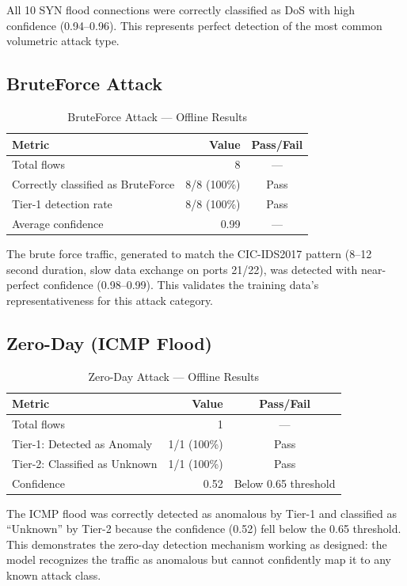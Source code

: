\documentclass[12pt,a4paper,twoside]{report}
\begin{document}
All 10 SYN flood connections were correctly classified as DoS with high confidence (0.94--0.96). This represents perfect detection of the most common volumetric attack type.

\subsection{BruteForce Attack}

\begin{table}[H]
\centering
\caption{BruteForce Attack — Offline Results}
\begin{tabularx}{\textwidth}{lrc}
\toprule
\textbf{Metric} & \textbf{Value} & \textbf{Pass/Fail} \\
\midrule
Total flows & 8 & — \\
Correctly classified as BruteForce & 8/8 (100\%) & Pass \\
Tier-1 detection rate & 8/8 (100\%) & Pass \\
Average confidence & 0.99 & — \\
\bottomrule
\end{tabularx}
\end{table}

The brute force traffic, generated to match the CIC-IDS2017 pattern (8--12 second duration, slow data exchange on ports 21/22), was detected with near-perfect confidence (0.98--0.99). This validates the training data's representativeness for this attack category.

\subsection{Zero-Day (ICMP Flood)}

\begin{table}[H]
\centering
\caption{Zero-Day Attack — Offline Results}
\begin{tabularx}{\textwidth}{lrc}
\toprule
\textbf{Metric} & \textbf{Value} & \textbf{Pass/Fail} \\
\midrule
Total flows & 1 & — \\
Tier-1: Detected as Anomaly & 1/1 (100\%) & Pass \\
Tier-2: Classified as Unknown & 1/1 (100\%) & Pass \\
Confidence & 0.52 & Below 0.65 threshold \\
\bottomrule
\end{tabularx}
\end{table}

The ICMP flood was correctly detected as anomalous by Tier-1 and classified as ``Unknown'' by Tier-2 because the confidence (0.52) fell below the 0.65 threshold. This demonstrates the zero-day detection mechanism working as designed: the model recognizes the traffic as anomalous but cannot confidently map it to any known attack class.
\end{document}
